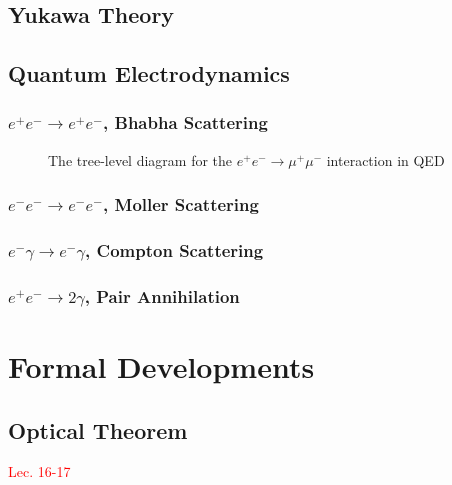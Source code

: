\documentclass{article}
\begin{document}
\subsection{Yukawa Theory}

\subsection{Quantum Electrodynamics}

\subsubsection{$e^+e^-\to e^+e^-$, Bhabha Scattering}

\begin{figure}[h]
    \centering
    \resizebox{.25\linewidth}{!}
    {
    \begin{feynman}
    \end{feynman}        
    }
  \caption{The tree-level diagram for the $e^+e^-\to\mu^+\mu^-$ interaction in QED}
\end{figure}

\subsubsection{$e^-e^-\to e^-e^-$, Moller Scattering}

\subsubsection{$e^-\gamma\to e^-\gamma$, Compton Scattering}

\subsubsection{$e^+e^-\to 2\gamma$, Pair Annihilation}

\pagebreak

\section{Formal Developments}

\subsection{Optical Theorem}
\textcolor{red}{Lec. 16-17}
\end{document}
